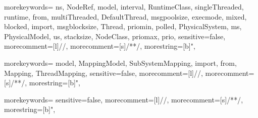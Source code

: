 {morekeywords={
	ns,
	NodeRef,
	model,
	interval,
	RuntimeClass,
	singleThreaded,
	runtime,
	from,
	multiThreaded,
	DefaultThread,
	msgpoolsize,
	execmode,
	mixed,
	blocked,
	import,
	msgblocksize,
	Thread,
	priomin,
	polled,
	PhysicalSystem,
	ms,
	PhysicalModel,
	us,
	stacksize,
	NodeClass,
	priomax,
	prio,
}
sensitive=false,
morecomment=[l]{//},
morecomment=[s]{/*}{*/},
morestring=[b]",
} 

{morekeywords={
	model,
	MappingModel,
	SubSystemMapping,
	import,
	from,
	Mapping,
	ThreadMapping,
}
sensitive=false,
morecomment=[l]{//},
morecomment=[s]{/*}{*/},
morestring=[b]",
} 

{morekeywords={
}
sensitive=false,
morecomment=[l]{//},
morecomment=[s]{/*}{*/},
morestring=[b]",
} 
